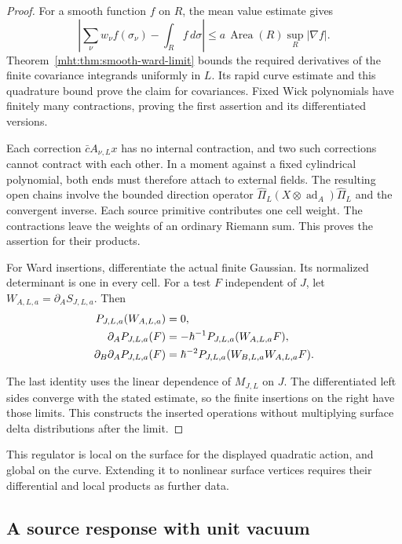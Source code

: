 \begin{proof}
For a smooth function $f$ on $R$, the mean value estimate gives
\[
 \left|\sum_\nu w_\nu f(\sigma_\nu)-\int_Rf\,d\sigma\right|
       \leq a\,\operatorname{Area}(R)\sup_R|\nabla f|.
\]
Theorem~\ref{mht:thm:smooth-ward-limit} bounds the required
derivatives of the finite covariance integrands uniformly in $L$.
Its rapid curve estimate and this quadrature bound prove the
claim for covariances. Fixed Wick polynomials have finitely many
contractions, proving the first assertion and its differentiated
versions.

Each correction $\bar cA_{\nu,L}x$ has no internal contraction,
and two such corrections cannot contract with each other.
In a moment against a fixed cylindrical polynomial, both ends
must therefore attach to external fields. The resulting open
chains involve the bounded direction operator
$\widehat\Pi_L(X\otimes\operatorname{ad}_A)\widehat\Pi_L$
and the convergent inverse. Each source primitive contributes
one cell weight. The contractions leave the weights of an
ordinary Riemann sum. This proves the assertion for their
products.

For Ward insertions, differentiate the actual finite Gaussian.
Its normalized determinant is one in every cell. For a test $F$
independent of $J$, let $W_{A,L,a}=\partial_AS_{J,L,a}$. Then
\begin{align}
 \mathcal P_{J,L,a}(W_{A,L,a})&=0,\notag\\
 \partial_A\mathcal P_{J,L,a}(F)
       &=-\hbar^{-1}\mathcal P_{J,L,a}(W_{A,L,a}F),\notag\\
 \partial_B\partial_A\mathcal P_{J,L,a}(F)
       &=\hbar^{-2}\mathcal P_{J,L,a}(W_{B,L,a}W_{A,L,a}F).
 \label{mht:eq:regulated-inserted-ward}
\end{align}

The last identity uses the linear dependence of $M_{J,L}$ on $J$.
The differentiated left sides converge with the stated estimate,
so the finite insertions on the right have those limits. This
constructs the inserted operations without multiplying surface
delta distributions after the limit.
\end{proof}

This regulator is local on the surface for the displayed quadratic
action, and global on the curve. Extending it to nonlinear surface
vertices requires their differential and local products as further
data.

\subsection{A source response with unit vacuum}

